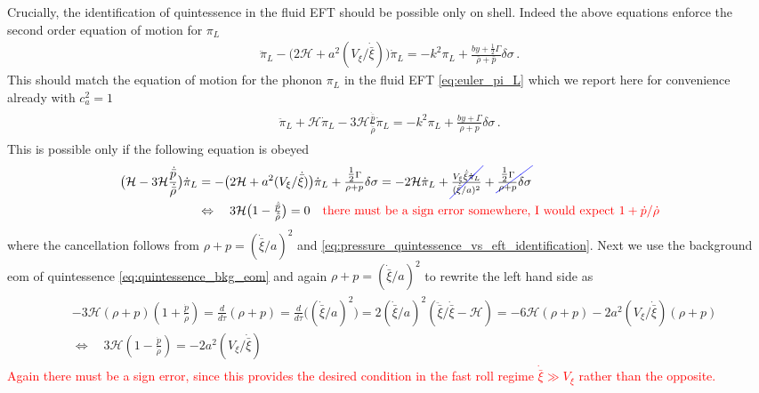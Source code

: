 Crucially, the identification of quintessence in the fluid EFT should be possible only on shell.
Indeed the above equations enforce the second order equation of motion for $\pi_L$ 
{\small \begin{align}
    \ddot{\pi}_L - \big(2\mathcal{H}+a^2(V_\xi/\dot{\bar{\xi}})\big)\dot{\pi}_L = -k^2\pi_L + \frac{by+\tfrac12 \Gamma}{\bar{\rho}+\bar{p}}\delta\sigma\,.
\end{align}}
This should match the equation of motion for the phonon $\pi_L$ in the fluid EFT \eqref{eq:euler_pi_L} which we report here for convenience already with $c_a^2=1$ 
{\small\begin{align}
\begin{aligned}
    \ddot{\pi}_L+ \mathcal{H}\dot{\pi}_L -3\mathcal{H}\frac{\dot{\bar{p}}}{\dot{\bar{\rho}}}\dot{\pi}_L= -k^2\pi_L +\tfrac{by+\Gamma}{\rho+p}\delta\sigma\,.
\end{aligned}\end{align}}
This is possible only if the following equation is obeyed
{\small\begin{align}
\begin{aligned}
     \big(\mathcal{H}-3\mathcal{H}\frac{\dot{\bar{p}}}{\dot{\bar{\rho}}}\big)\dot{\pi}_L &= -\big(2\mathcal{H}+a^2(V_\xi/\dot{\bar{\xi}})\big)\dot{\pi}_L+\tfrac{\tfrac12\Gamma}{\rho+p}\delta\sigma
     = -2\mathcal{H}\dot{\pi}_L+\bluecancel{\tfrac{V_\xi \dot{\bar{\xi}}\dot{\pi}_L}{(\dot{\bar{\xi}}/a)^2}}+\bluecancel{\tfrac{\tfrac12\Gamma}{\rho+p}\delta\sigma}\\
     &\Leftrightarrow\quad 3\mathcal{H}\big(1-\tfrac{\dot{\bar{p}}}{\dot{\bar{\rho}}}\big)=0\quad \textcolor{red}{\text{there must be a sign error somewhere, I would expect $1+\dot{p}/\dot{\rho}$}}
\end{aligned}\end{align}}
where the cancellation follows from $\rho+p=(\dot{\bar{\xi}}/a)^2$ and \eqref{eq:pressure_quintessence_vs_eft_identification}. 
Next we use the background eom of quintessence \eqref{eq:quintessence_bkg_eom} and again $\rho+p=(\dot{\bar{\xi}}/a)^2$ to rewrite the left hand side as
{\small\begin{align}
\begin{aligned}
     &-3\mathcal{H}(\rho+p)(1+\tfrac{\dot{p}}{\dot{\rho}})=\tfrac{d}{d\tau}(\rho+p)= \tfrac{d}{d\tau}\big((\dot{\bar{\xi}}/a)^2\big) = 2(\dot{\bar{\xi}}/a)^2 (\ddot{\bar{\xi}}/\dot{\bar{\xi}} - \mathcal{H}) = -6\mathcal{H}(\rho+p) -2 a^2(V_\xi/\dot{\bar{\xi}})(\rho+p)\\
     &\Leftrightarrow\quad 3\mathcal{H}(1-\tfrac{\dot{p}}{\dot{\rho}})= -2 a^2(V_\xi/\dot{\bar{\xi}})
\end{aligned}\end{align}}
\textcolor{red}{Again there must be a sign error, since this provides the desired condition in the fast roll regime $\dot{\bar{\xi}}\gg V_\xi$ rather than the opposite.}